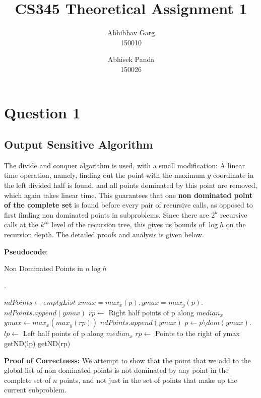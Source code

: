 \documentclass{article}
\title{CS345 Theoretical Assignment 1}
\author{Abhibhav Garg \\ 150010 \and Abhisek Panda \\ 150026}
\begin{document}
\maketitle

\section{Question 1}
\subsection{Output Sensitive Algorithm}
The divide and conquer algorithm is used, with a small modification: A linear time operation, namely, finding out the point with the maximum $y$ coordinate in the left divided half is found, and all points dominated by this point are removed, which again takes linear time.
This guarantees that one \textbf{non dominated point of the complete set} is found before every pair of recursive calls, as opposed to first finding non dominated points in subproblems.
Since there are $2^{k}$ recursive calls at the $k^{th}$ level of the recursion tree, this gives us bounds of $\log{h}$ on the recursion depth.
The detailed proofs and analysis is given below.\\
\par
\textbf{Pseudocode}:
\begin{algorithm}
  \caption{Non Dominated Points in $n \log{h}$}.
  \label{alg:nd}
  \begin{algorithmic}
    \State $ndPoints \gets emptyList$ 
      \State $xmax = max_{x}(p), ymax = max_{y}(p)$.
        \State $ndPoints.append(ymax)$ 
        \State \Return
      \EndIf
      \State $rp \gets$ Right half points of p along $median_{x}$
      \State $ymax \gets max_{x}(max_{y}(rp))$
      \State $ndPoints.append(ymax)$ 
      \State $p \gets p \setminus dom(ymax)$. 
      \State $lp \gets$ Left half points of p along $median_{x}$
      \State $rp \gets$ Points to the right of ymax
      \State getND(lp)
      \State getND(rp)
      \State \Return
    \EndFunction
  \end{algorithmic}
\end{algorithm}
\par
\textbf{Proof of Correctness:} We attempt to show that the point that we add to the global list of non dominated points is not dominated by any point in the complete set of $n$ points, and not just in the set of points that make up the current subproblem.
\end{document}
